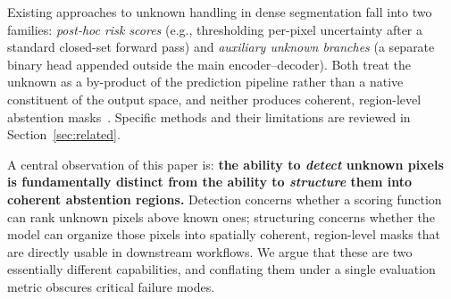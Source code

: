 \documentclass[journal]{IEEEtai}
\begin{document}

Existing approaches to unknown handling in dense segmentation fall into two families:
\emph{post-hoc risk scores} (e.g., thresholding per-pixel uncertainty after a standard
closed-set forward pass) and \emph{auxiliary unknown branches} (a separate binary
head appended outside the main encoder--decoder).
Both treat the unknown as a by-product of the prediction pipeline rather than a native
constituent of the output space, and neither produces coherent, region-level abstention
masks~\cite{hendrycks2017baselinedetecting,liu2020energyout,gal2016dropoutbayesian,grcic2023advantagesmask}.
Specific methods and their limitations are reviewed in Section~\ref{sec:related}.



A central observation of this paper is:
\textbf{the ability to \emph{detect} unknown pixels is fundamentally distinct from
the ability to \emph{structure} them into coherent abstention regions.}
Detection concerns whether a scoring function can rank unknown pixels above known ones;
structuring concerns whether the model can organize those pixels into spatially coherent,
region-level masks that are directly usable in downstream workflows.
We argue that these are two essentially different capabilities, and conflating them
under a single evaluation metric obscures critical failure modes.
\end{document}
